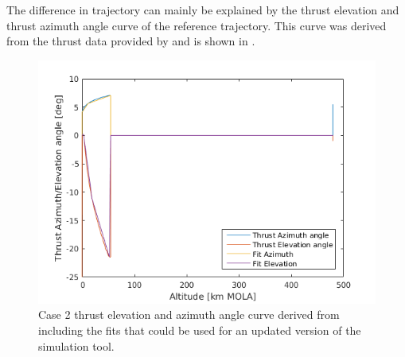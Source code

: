 \noindent
The difference in trajectory can mainly be explained by the thrust elevation and thrust azimuth angle curve of the reference trajectory. This curve was derived from the thrust data provided by \cite{benito2016trajectory} and is shown in . 

\begin{figure}[H]
\centering
\includegraphics[width=0.7 \textwidth]{figures/verification/case2/thrustAzimuthAndElevationDerivedFromCase2Version2.png}
\caption{Case 2 thrust elevation and azimuth angle curve derived from \cite{benito2016trajectory} including the fits that could be used for an updated version of the simulation tool.}
\label{fig:thrustAzimuthAndElevationDerivedFromCase2Version2}
\end{figure}


%
%



